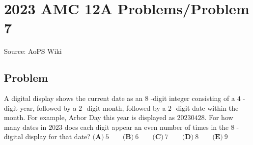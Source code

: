 \documentclass[12pt]{article}
\begin{document}
\section*{{2023 AMC 12A Problems/Problem 7}}
Source: AoPS Wiki

\subsection*{Problem}
A digital display shows the current date as an $8$ -digit integer consisting of a $4$ -digit year, followed by a $2$ -digit month, followed by a $2$ -digit date within the month. For example, Arbor Day this year is displayed as $20230428.$ For how many dates in $2023$ does each digit appear an even number of times in the $8$ -digital display for that date? $\textbf{(A)}~5\qquad\textbf{(B)}~6\qquad\textbf{(C)}~7\qquad\textbf{(D)}~8\qquad\textbf{(E)}~9$
\end{document}
